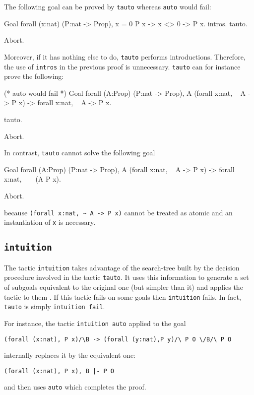 The following goal can be proved by {\tt tauto} whereas {\tt auto}
would fail:

\begin{coq_example}
Goal forall (x:nat) (P:nat -> Prop), x = 0 \/ P x -> x <> 0 -> P x.
  intros.
  tauto.
\end{coq_example}
\begin{coq_eval}
Abort.
\end{coq_eval}

Moreover, if it has nothing else to do, {\tt tauto} performs
introductions. Therefore, the use of {\tt intros} in the previous
proof is unnecessary. {\tt tauto} can for instance prove the
following:
\begin{coq_example}
(* auto would fail *)
Goal forall (A:Prop) (P:nat -> Prop),
    A \/ (forall x:nat, ~ A -> P x) -> forall x:nat, ~ A -> P x.

  tauto.
\end{coq_example}
\begin{coq_eval}
Abort.
\end{coq_eval}

\Rem In contrast, {\tt tauto} cannot solve the following goal

\begin{coq_example*}
Goal forall (A:Prop) (P:nat -> Prop),
    A \/ (forall x:nat, ~ A -> P x) -> forall x:nat, ~ ~ (A \/ P x).
\end{coq_example*}
\begin{coq_eval}
Abort.
\end{coq_eval}

because \verb=(forall x:nat, ~ A -> P x)= cannot be treated as atomic and an
instantiation of \verb=x= is necessary.

\subsection{\tt intuition {\tac}
\label{intuition}}

The tactic \texttt{intuition} takes advantage of the search-tree built
by the decision procedure involved in the tactic {\tt tauto}. It uses
this information to generate a set of subgoals equivalent to the
original one (but simpler than it) and applies the tactic 
{\tac} to them \cite{Mun94}. If this tactic fails on some goals then
{\tt intuition} fails. In fact, {\tt tauto} is simply {\tt intuition
  fail}.

For instance, the tactic {\tt intuition auto} applied to the goal
\begin{verbatim}
(forall (x:nat), P x)/\B -> (forall (y:nat),P y)/\ P O \/B/\ P O
\end{verbatim}
internally replaces it by the equivalent one:
\begin{verbatim}
(forall (x:nat), P x), B |- P O
\end{verbatim}
and then uses {\tt auto} which completes the proof.

